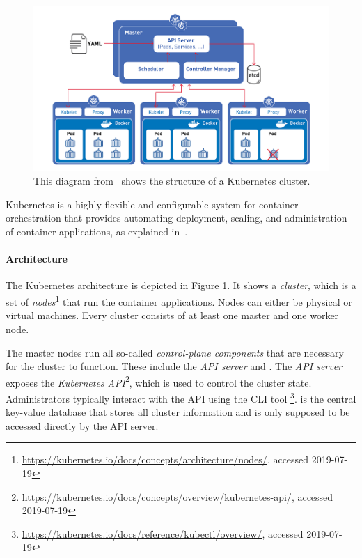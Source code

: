 \begin{figure}[H]
\begin{center}
    \includegraphics[width=0.8\linewidth]{figures/k8s_architecture.png}
    \caption[Kubernetes Architecture]{This diagram from~\textcite{k8sDiagram} shows the structure of a Kubernetes cluster.}
    \label{fig:k8sArchitecture}
\end{center}
\end{figure}


Kubernetes is a highly flexible and configurable system for container orchestration that provides automating deployment, scaling, and administration of container applications, as explained in~\textcite{k8sdocs}. 

\paragraph{Architecture}

The Kubernetes architecture is depicted in Figure \ref{fig:k8sArchitecture}. It shows a \textit{cluster}, which is a set of \textit{nodes}\footnote{\url{https://kubernetes.io/docs/concepts/architecture/nodes/}, accessed 2019-07-19} that run the container applications. Nodes can either be physical or virtual machines. Every cluster consists of at least one master and one worker node. 

The master nodes run all so-called \textit{control-plane components} that are necessary for the cluster to function. These include the \textit{API server} and . The \textit{API server} exposes the \textit{Kubernetes API}\footnote{\url{https://kubernetes.io/docs/concepts/overview/kubernetes-api/}, accessed 2019-07-19}, which is used to control the cluster state. Administrators typically interact with the API using the CLI tool \footnote{\url{https://kubernetes.io/docs/reference/kubectl/overview/}, accessed 2019-07-19}.  is the central key-value database that stores all cluster information and is only supposed to be accessed directly by the API server.

